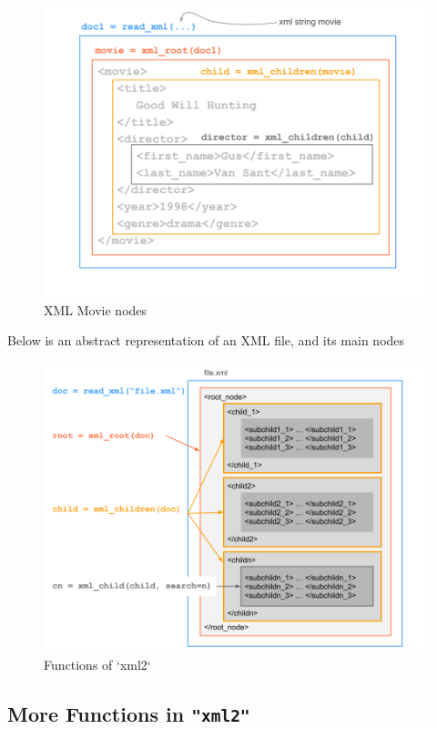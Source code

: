 \documentclass[
]{book}
\begin{document}
\begin{figure}

{\centering \includegraphics[width=0.7\linewidth]{images/xml/xml-movie2} 

}

\caption{XML Movie nodes}\label{fig:unnamed-chunk-23}
\end{figure}

Below is an abstract representation of an XML file, and its main nodes

\begin{figure}

{\centering \includegraphics[width=0.85\linewidth]{images/xml/xml-functions} 

}

\caption{Functions of `xml2`}\label{fig:unnamed-chunk-24}
\end{figure}

\hypertarget{more-functions-in-xml2}{%
\subsection{\texorpdfstring{More Functions in \texttt{"xml2"}}{More Functions in "xml2"}}\label{more-functions-in-xml2}}
\end{document}
